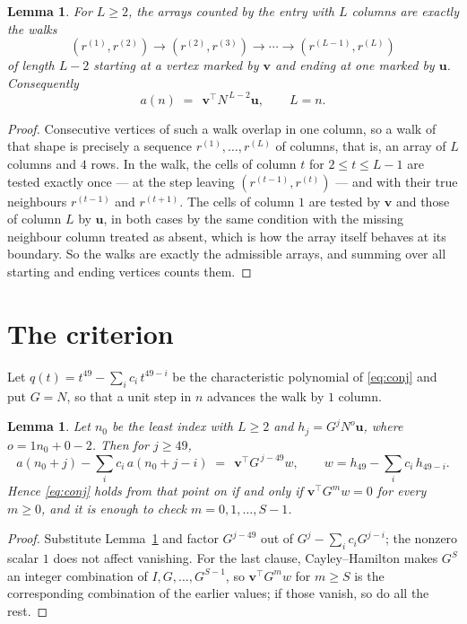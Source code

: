 \documentclass[11pt,a4paper]{article}
\theoremstyle{plain}
\newtheorem{lemma}[theorem]{Lemma}
\theoremstyle{definition}
\begin{document}
\begin{lemma}\label{lem:walk}
For $L\ge2$, the arrays counted by the entry with $L$ columns are exactly the walks
\[
(r^{(1)},r^{(2)})\to(r^{(2)},r^{(3)})\to\cdots\to(r^{(L-1)},r^{(L)})
\]
of length $L-2$ starting at a vertex marked by $\mathbf{v}$ and ending at one marked by
$\mathbf{u}$. Consequently
\[
a(n)\;=\;\,\mathbf{v}^{\!\top}N^{\,L-2}\mathbf{u},\qquad L=n .
\]
\end{lemma}

\begin{proof}
Consecutive vertices of such a walk overlap in one column, so a walk of that shape is
precisely a sequence $r^{(1)},\dots,r^{(L)}$ of columns, that is, an array of $L$ columns
and $4$ rows. In the walk, the cells of column $t$ for $2\le t\le L-1$ are tested
exactly once --- at the step leaving $(r^{(t-1)},r^{(t)})$ --- and with their true
neighbours $r^{(t-1)}$ and $r^{(t+1)}$. The cells of column $1$ are tested by
$\mathbf{v}$ and those of column $L$ by $\mathbf{u}$, in both cases by the same condition
with the missing neighbour column treated as absent, which is how the array itself behaves at
its boundary. So the walks are exactly the admissible arrays, and summing over all starting
and ending vertices counts them.
\end{proof}

\section{The criterion}

Let $q(t)=t^{49}-\sum_i c_i\,t^{49-i}$ be the characteristic polynomial of
\eqref{eq:conj} and put $G=N$, so that a unit step in $n$ advances the walk by
$1$ column.

\begin{lemma}\label{lem:crit}
Let $n_0$ be the least index with $L\ge2$ and $h_j=G^{j}N^{o}\mathbf{u}$, where
$o=1n_0+0-2$. Then for $j\ge49$,
\[
a(n_0+j)-\sum_i c_i\,a(n_0+j-i)\;=\;\,\mathbf{v}^{\!\top}G^{\,j-49}w,
\qquad w=h_{49}-\sum_i c_i\,h_{49-i} .
\]
Hence \eqref{eq:conj} holds from that point on if and only if
$\mathbf{v}^{\!\top}G^{m}w=0$ for every $m\ge0$, and it is enough to check
$m=0,1,\dots,S-1$.
\end{lemma}

\begin{proof}
Substitute Lemma~\ref{lem:walk} and factor $G^{j-49}$ out of
$G^{j}-\sum_ic_iG^{j-i}$; the nonzero scalar $1$ does not affect
vanishing. For the last clause, Cayley--Hamilton makes $G^{S}$ an integer combination of
$I,G,\dots,G^{S-1}$, so $\mathbf{v}^{\!\top}G^{m}w$ for $m\ge S$ is the corresponding
combination of the earlier values; if those vanish, so do all the rest.
\end{proof}
\end{document}
